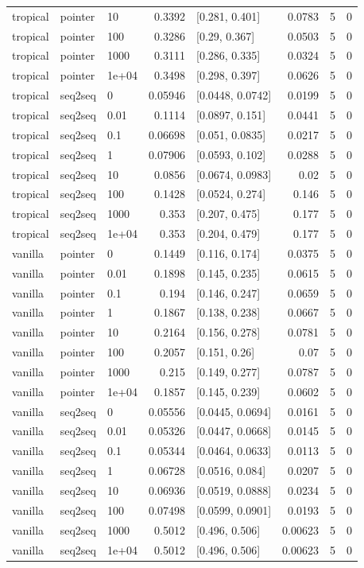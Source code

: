 \documentclass[10pt]{article}
\begin{document}
{\begin{longtable}{lllrlrrr}
tropical & pointer & 10 & 0.3392 & [0.281, 0.401] & 0.0783 & 5 & 0\\
tropical & pointer & 100 & 0.3286 & [0.29, 0.367] & 0.0503 & 5 & 0\\
tropical & pointer & 1000 & 0.3111 & [0.286, 0.335] & 0.0324 & 5 & 0\\
tropical & pointer & 1e+04 & 0.3498 & [0.298, 0.397] & 0.0626 & 5 & 0\\
tropical & seq2seq & 0 & 0.05946 & [0.0448, 0.0742] & 0.0199 & 5 & 0\\
tropical & seq2seq & 0.01 & 0.1114 & [0.0897, 0.151] & 0.0441 & 5 & 0\\
tropical & seq2seq & 0.1 & 0.06698 & [0.051, 0.0835] & 0.0217 & 5 & 0\\
tropical & seq2seq & 1 & 0.07906 & [0.0593, 0.102] & 0.0288 & 5 & 0\\
tropical & seq2seq & 10 & 0.0856 & [0.0674, 0.0983] & 0.02 & 5 & 0\\
tropical & seq2seq & 100 & 0.1428 & [0.0524, 0.274] & 0.146 & 5 & 0\\
tropical & seq2seq & 1000 & 0.353 & [0.207, 0.475] & 0.177 & 5 & 0\\
tropical & seq2seq & 1e+04 & 0.353 & [0.204, 0.479] & 0.177 & 5 & 0\\
vanilla & pointer & 0 & 0.1449 & [0.116, 0.174] & 0.0375 & 5 & 0\\
vanilla & pointer & 0.01 & 0.1898 & [0.145, 0.235] & 0.0615 & 5 & 0\\
vanilla & pointer & 0.1 & 0.194 & [0.146, 0.247] & 0.0659 & 5 & 0\\
vanilla & pointer & 1 & 0.1867 & [0.138, 0.238] & 0.0667 & 5 & 0\\
vanilla & pointer & 10 & 0.2164 & [0.156, 0.278] & 0.0781 & 5 & 0\\
vanilla & pointer & 100 & 0.2057 & [0.151, 0.26] & 0.07 & 5 & 0\\
vanilla & pointer & 1000 & 0.215 & [0.149, 0.277] & 0.0787 & 5 & 0\\
vanilla & pointer & 1e+04 & 0.1857 & [0.145, 0.239] & 0.0602 & 5 & 0\\
vanilla & seq2seq & 0 & 0.05556 & [0.0445, 0.0694] & 0.0161 & 5 & 0\\
vanilla & seq2seq & 0.01 & 0.05326 & [0.0447, 0.0668] & 0.0145 & 5 & 0\\
vanilla & seq2seq & 0.1 & 0.05344 & [0.0464, 0.0633] & 0.0113 & 5 & 0\\
vanilla & seq2seq & 1 & 0.06728 & [0.0516, 0.084] & 0.0207 & 5 & 0\\
vanilla & seq2seq & 10 & 0.06936 & [0.0519, 0.0888] & 0.0234 & 5 & 0\\
vanilla & seq2seq & 100 & 0.07498 & [0.0599, 0.0901] & 0.0193 & 5 & 0\\
vanilla & seq2seq & 1000 & 0.5012 & [0.496, 0.506] & 0.00623 & 5 & 0\\
vanilla & seq2seq & 1e+04 & 0.5012 & [0.496, 0.506] & 0.00623 & 5 & 0\\
\bottomrule
\end{longtable}
}
\end{document}
